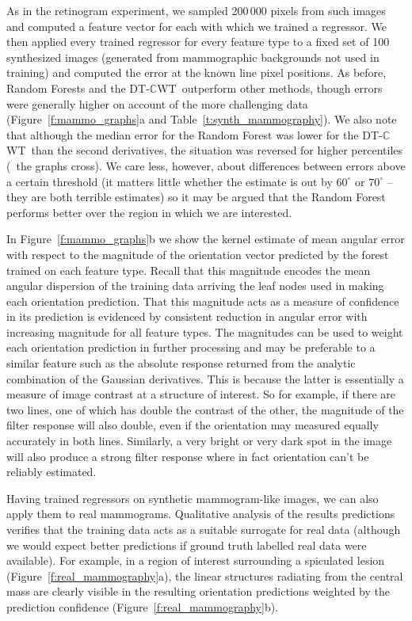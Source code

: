 \documentclass[10pt,twocolumn,letterpaper]{article}
\newcommand{\fref}[1]{Figure~\ref{#1}}
\newcommand{\tref}[1]{Table~\ref{#1}}
\def\dtcwt{DT-$\mathbb{C}$WT}
\begin{document}
As in the retinogram experiment, we sampled 200\,000 pixels from such images and computed a feature vector for each with which we trained a regressor. We then applied every trained regressor for every feature type to a fixed set of 100 synthesized images (generated from mammographic backgrounds not used in training)  and computed the error at the known line pixel positions. As before, Random Forests and the \dtcwt~outperform other methods, though errors were generally higher on account of the more challenging data (\fref{f:mammo_graphs}a and \tref{t:synth_mammography}). We also note that although the median error for the Random Forest was lower for the \dtcwt~than the second derivatives, the situation was reversed for higher percentiles (\ie~the graphs cross). We care less, however, about differences between errors above a certain threshold (it matters little whether the estimate is out by $60^\circ$ or $70^\circ$ -- they are both terrible estimates) so it may be argued that the Random Forest performs better over the region in which we are interested.

In \fref{f:mammo_graphs}b we show the kernel estimate of mean angular error with respect to the magnitude of the orientation vector predicted by the forest trained on each feature type. Recall that this magnitude encodes the mean angular dispersion of the training data arriving the leaf nodes used in making each orientation prediction. That this magnitude acts as a measure of confidence in its prediction is evidenced by consistent reduction in angular error with increasing magnitude for all feature types. The magnitudes can be used to weight each orientation prediction in further processing and may be preferable to a similar feature such as the absolute response returned from the analytic combination of the Gaussian derivatives. This is because the latter is essentially a measure of image contrast at a structure of interest. So for example, if there are two lines, one of which has double the contrast of the other, the magnitude of the filter response will also double, even if the orientation may measured equally accurately in both lines. Similarly, a very bright or very dark spot in the image will also produce a strong filter response where in fact orientation can't be reliably estimated.

Having trained regressors on synthetic mammogram-like images, we can also apply them to real mammograms. Qualitative analysis of the results predictions verifies that the training data acts as a suitable surrogate for real data (although we would expect better predictions if ground truth labelled real data were available). For example, in a region of interest surrounding a spiculated lesion (\fref{f:real_mammography}a), the linear structures radiating from the central mass are clearly visible in the resulting orientation predictions weighted by the prediction confidence (\fref{f:real_mammography}b).
\end{document}
